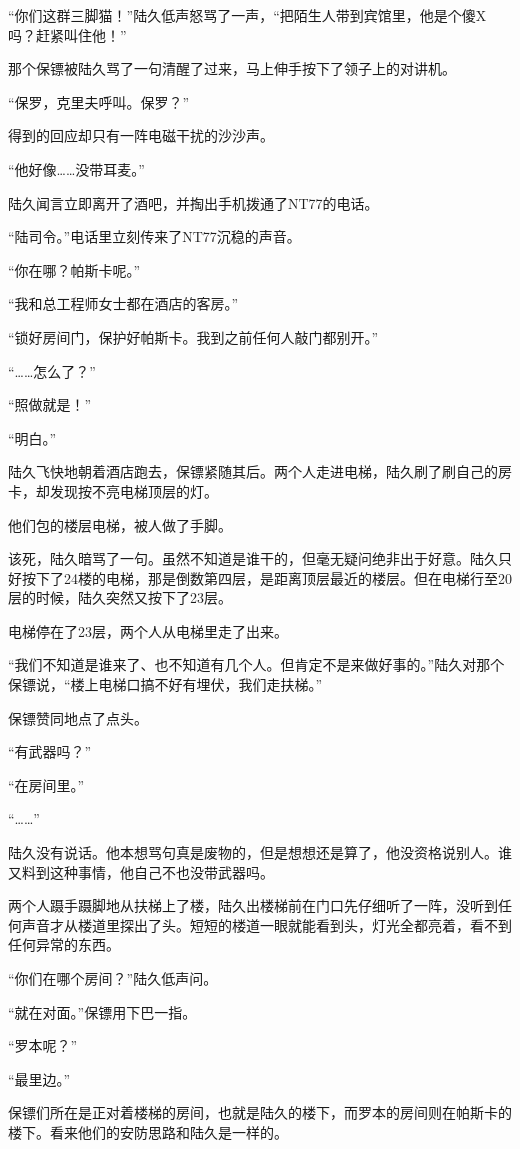 “你们这群三脚猫！”陆久低声怒骂了一声，“把陌生人带到宾馆里，他是个傻X吗？赶紧叫住他！”

那个保镖被陆久骂了一句清醒了过来，马上伸手按下了领子上的对讲机。

“保罗，克里夫呼叫。保罗？”

得到的回应却只有一阵电磁干扰的沙沙声。

“他好像……没带耳麦。”

陆久闻言立即离开了酒吧，并掏出手机拨通了NT77的电话。

“陆司令。”电话里立刻传来了NT77沉稳的声音。

“你在哪？帕斯卡呢。”

“我和总工程师女士都在酒店的客房。”

“锁好房间门，保护好帕斯卡。我到之前任何人敲门都别开。”

“……怎么了？”

“照做就是！”

“明白。”

陆久飞快地朝着酒店跑去，保镖紧随其后。两个人走进电梯，陆久刷了刷自己的房卡，却发现按不亮电梯顶层的灯。

他们包的楼层电梯，被人做了手脚。

该死，陆久暗骂了一句。虽然不知道是谁干的，但毫无疑问绝非出于好意。陆久只好按下了24楼的电梯，那是倒数第四层，是距离顶层最近的楼层。但在电梯行至20层的时候，陆久突然又按下了23层。

电梯停在了23层，两个人从电梯里走了出来。

“我们不知道是谁来了、也不知道有几个人。但肯定不是来做好事的。”陆久对那个保镖说，“楼上电梯口搞不好有埋伏，我们走扶梯。”

保镖赞同地点了点头。

“有武器吗？”

“在房间里。”

“……”

陆久没有说话。他本想骂句真是废物的，但是想想还是算了，他没资格说别人。谁又料到这种事情，他自己不也没带武器吗。

两个人蹑手蹑脚地从扶梯上了楼，陆久出楼梯前在门口先仔细听了一阵，没听到任何声音才从楼道里探出了头。短短的楼道一眼就能看到头，灯光全都亮着，看不到任何异常的东西。

“你们在哪个房间？”陆久低声问。

“就在对面。”保镖用下巴一指。

“罗本呢？”

“最里边。”

保镖们所在是正对着楼梯的房间，也就是陆久的楼下，而罗本的房间则在帕斯卡的楼下。看来他们的安防思路和陆久是一样的。

